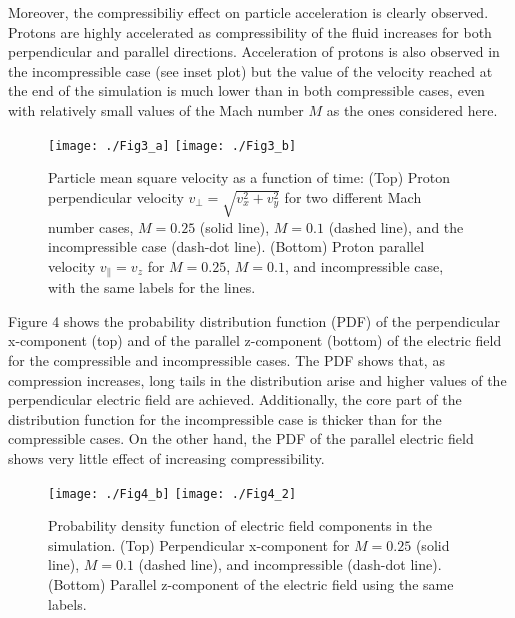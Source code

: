 \documentclass[%
aip,pop,amsmath,amssymb,
 reprint,%
]{revtex4-1}
\begin{document}
Moreover, the compressibiliy effect on particle acceleration 
is clearly observed.
Protons are highly accelerated as compressibility of the fluid increases 
for both perpendicular and parallel directions.
Acceleration of protons is also observed in the 
incompressible case (see inset plot) but
the value of the velocity reached at the end of the simulation is much lower than in both
compressible cases, even with relatively small values of the Mach number $M$ as the ones
considered here.

\begin{figure}[h!]
\begin{center}
{\texttt{[image: ./Fig3\_a]}}
{\texttt{[image: ./Fig3\_b]}}
\caption{Particle mean square velocity as a function of time: (Top)
Proton perpendicular velocity $v_\perp = \sqrt{v_x^2 + v_y^2}$ 
for two different Mach number
cases, $M=0.25$ (solid line), $M=0.1$ (dashed line), and the
incompressible case (dash-dot line). 
(Bottom) Proton parallel velocity $v_\parallel=v_z$ for $M=0.25$, $M=0.1$, 
and incompressible case, with the
same labels for the lines.}
\end{center}
\label{mean square velocity}
\end{figure}

Figure 4 shows the probability distribution function (PDF) of the
perpendicular x-component (top) and of the parallel z-component (bottom) 
of the electric field 
for the compressible and incompressible cases. The PDF shows that, as compression increases,
long tails in the distribution arise and higher values of the perpendicular electric field 
are achieved. Additionally, the core part of the distribution function for the incompressible 
case is thicker than for the compressible cases. On the other hand, the PDF of the parallel electric field shows very 
little effect of increasing compressibility.

\begin{figure}
\begin{center}
{\texttt{[image: ./Fig4\_b]}}
{\texttt{[image: ./Fig4\_2]}}
\caption{Probability density function of electric field components 
in the simulation. (Top) Perpendicular x-component 
for $M=0.25$ (solid line), $M=0.1$ (dashed line), and incompressible 
(dash-dot line). (Bottom) Parallel z-component of the electric field 
using the same labels.}
\end{center}
\label{mean square velocity}
\end{figure}
\end{document}
